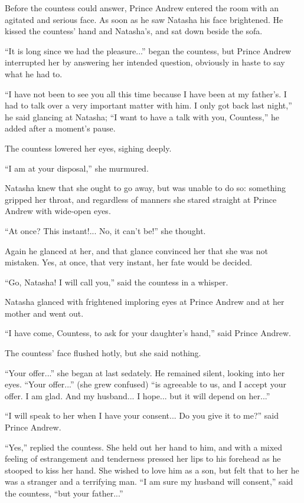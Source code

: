 Before the countess could answer, Prince Andrew entered the room
with an agitated and serious face. As soon as he saw Natasha his
face brightened. He kissed the countess' hand and Natasha's, and
sat down beside the sofa.

``It is long since we had the pleasure...'' began the countess,
but Prince Andrew interrupted her by answering her intended
question, obviously in haste to say what he had to.

``I have not been to see you all this time because I have been at
my father's. I had to talk over a very important matter with
him. I only got back last night,'' he said glancing at Natasha;
``I want to have a talk with you, Countess,'' he added after a
moment's pause.

The countess lowered her eyes, sighing deeply.

``I am at your disposal,'' she murmured.

Natasha knew that she ought to go away, but was unable to do so:
something gripped her throat, and regardless of manners she
stared straight at Prince Andrew with wide-open eyes.

``At once? This instant!... No, it can't be!'' she thought.

Again he glanced at her, and that glance convinced her that she
was not mistaken. Yes, at once, that very instant, her fate would
be decided.

``Go, Natasha! I will call you,'' said the countess in a whisper.

Natasha glanced with frightened imploring eyes at Prince Andrew
and at her mother and went out.

``I have come, Countess, to ask for your daughter's hand,'' said
Prince Andrew.

The countess' face flushed hotly, but she said nothing.

``Your offer...'' she began at last sedately. He remained silent,
looking into her eyes. ``Your offer...'' (she grew confused) ``is
agreeable to us, and I accept your offer. I am glad. And my
husband... I hope... but it will depend on her...''

``I will speak to her when I have your consent... Do you give it
to me?''  said Prince Andrew.

``Yes,'' replied the countess. She held out her hand to him, and
with a mixed feeling of estrangement and tenderness pressed her
lips to his forehead as he stooped to kiss her hand. She wished
to love him as a son, but felt that to her he was a stranger and
a terrifying man. ``I am sure my husband will consent,'' said the
countess, ``but your father...''

